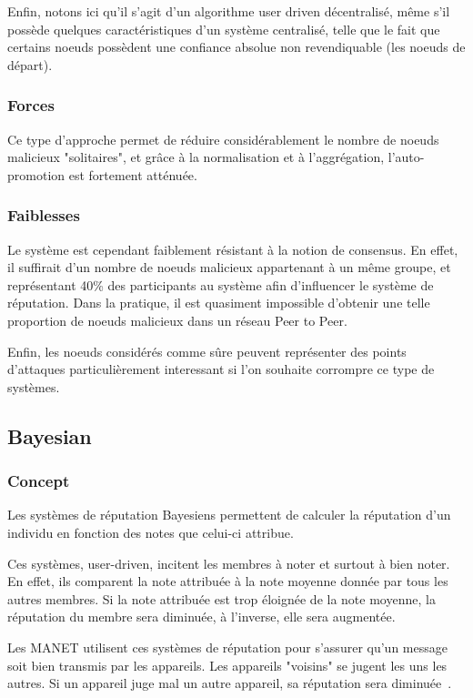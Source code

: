 \documentclass[a4paper, 11pt]{article} %
\begin{document}
Enfin, notons ici qu'il s'agit d'un algorithme user driven décentralisé, même s'il possède quelques caractéristiques d'un système centralisé, telle que le fait que certains noeuds possèdent une confiance absolue non revendiquable (les noeuds de départ).

\subsubsection{Forces}
Ce type d'approche permet de réduire considérablement le nombre de noeuds malicieux "solitaires", et grâce à la normalisation et à l'aggrégation, l'auto-promotion est fortement atténuée.

\subsubsection{Faiblesses}
Le système est cependant faiblement résistant à la notion de consensus.
En effet, il suffirait d'un nombre de noeuds malicieux appartenant à un même groupe, et représentant 40\% des participants au système afin d'influencer le système de réputation.
Dans la pratique, il est quasiment impossible d'obtenir une telle proportion de noeuds malicieux dans un réseau Peer to Peer.

Enfin, les noeuds considérés comme sûre peuvent représenter des points d'attaques particulièrement interessant si l'on souhaite corrompre ce type de systèmes.

\subsection{Bayesian}
\subsubsection{Concept}
Les systèmes de réputation Bayesiens permettent de calculer la réputation d'un individu en fonction des notes que celui-ci attribue.

Ces systèmes, user-driven, incitent les membres à noter et surtout à bien noter. En effet, ils comparent la note attribuée à la note moyenne donnée par tous les autres membres. Si la note attribuée est trop éloignée de la note moyenne, la réputation du membre sera diminuée, à l'inverse, elle sera augmentée.

Les MANET utilisent ces systèmes de réputation pour s'assurer qu'un message soit bien transmis par les appareils. Les appareils "voisins" se jugent les uns les autres. Si un appareil juge mal un autre appareil, sa réputation sera diminuée~\cite{Bayesian}.
\end{document}
